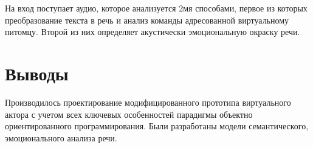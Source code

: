 На вход поступает аудио, которое анализуется 2мя способами, первое из которых преобразование текста в речь и 
анализ команды адресованной виртуальному питомцу. Второй из них определяет акустически эмоциональную окраску речи.

\section{Выводы}

Производилось проектирование модифицированного прототипа виртуального актора 
с учетом всех ключевых особенностей парадигмы объектно ориентированного программирования. 
Были разработаны модели семантического, эмоционального анализа речи.

